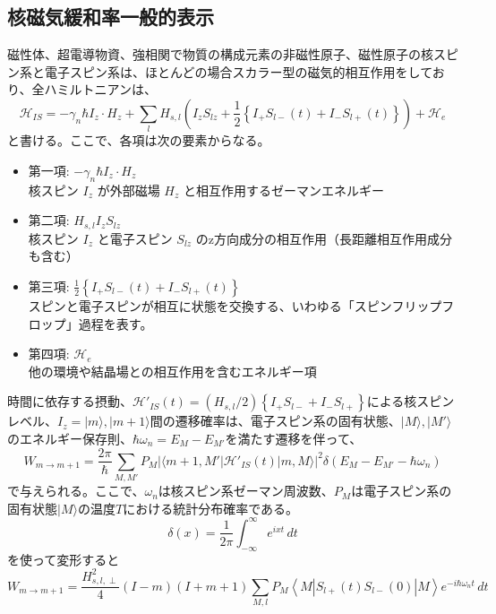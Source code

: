 \documentclass[11pt,a4j]{jreport}
\begin{document}
\subsection{核磁気緩和率一般的表示}
磁性体、超電導物資、強相関で物質の構成元素の非磁性原子、磁性原子の核スピン系と電子スピン系は、ほとんどの場合スカラー型の磁気的相互作用をしており、全ハミルトニアンは、
\begin{equation}
 \mathcal H_{IS} = -\gamma_n\hbar I_z\cdot H_z + \sum_l H_{s,l} \left(I_z S_{lz}+\frac{1}{2}\left\{I_+ S_{l-}(t)+I_-S_{l+}(t)\right\}\right) + \mathcal H_e
\end{equation}
と書ける。ここで、各項は次の要素からなる。
\begin{itemize}
  \item 第一項: $-\gamma_n \hbar I_z \cdot H_z$\\
  核スピン $I_z$ が外部磁場 $H_z$ と相互作用するゼーマンエネルギー
  \item 第二項: $H_{s,l} I_z S_{lz}$\\
  核スピン $I_z$ と電子スピン $S_{lz}$ のz方向成分の相互作用（長距離相互作用成分も含む）
  \item 第三項: $\frac{1}{2} \left\{ I_+ S_{l-}(t) + I_- S_{l+}(t) \right\}$\\
  スピンと電子スピンが相互に状態を交換する、いわゆる「スピンフリップフロップ」過程を表す。
  \item 第四項: $\mathcal H_e$\\
  他の環境や結晶場との相互作用を含むエネルギー項
\end{itemize}
時間に依存する摂動、$\mathcal H'_{IS}(t) = (H_{s,l}/2)\left\{I_+S_{l-}+I_-S_{l+}\right\}$による核スピンレベル、$I_z=|m\rangle,|m+1\rangle $間の遷移確率は、電子スピン系の固有状態、$|M\rangle,|M'\rangle$のエネルギー保存則、$\hbar \omega_n = E_M - E_{M'}$を満たす遷移を伴って、
\begin{equation}
  W_{m\rightarrow m+1} = \frac{2\pi}{\hbar} \sum_{M,M'}P_M|\langle m+1,M'|\mathcal H'_{IS}(t)|m,M\rangle|^2 \delta(E_M-E_{M'}-\hbar \omega_n) 
\end{equation}
で与えられる。ここで、$\omega_n$は核スピン系ゼーマン周波数、$P_M$は電子スピン系の固有状態$|M\rangle$の温度$T$における統計分布確率である。
\begin{equation}
  \delta(x) = \frac{1}{2\pi} \int_{-\infty}^{\infty} e^{i x t} \, dt
\end{equation}
を使って変形すると
\begin{equation}
  W_{m \rightarrow m+1} = \frac{H_{s,l, \perp}^2}{4} (I - m)(I + m + 1) \sum_{M, l} P_M \left\langle M \left| S_{l+}(t)S_{l-}(0) \right| M \right\rangle e^{-i \hbar \omega_n t} \, dt
\end{equation}
\end{document}
